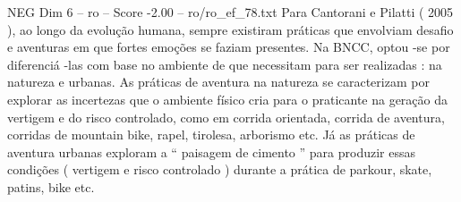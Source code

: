 \begin{textsample}{NEG Dim 6 – ro – Score -2.00 – ro/ro\_ef\_78.txt}
Para Cantorani e Pilatti ( 2005 ), ao longo da evolução humana, sempre existiram práticas que envolviam desafio e aventuras em que fortes emoções se faziam presentes.
Na BNCC, optou -se por diferenciá -las com base no ambiente de que necessitam para ser realizadas : na natureza e urbanas.
As práticas de aventura na natureza se caracterizam por explorar as incertezas que o ambiente físico cria para o praticante na geração da vertigem e do risco controlado, como em corrida orientada, corrida de aventura, corridas de mountain bike, rapel, tirolesa, arborismo etc.
Já as práticas de aventura urbanas exploram a “ paisagem de cimento ” para produzir essas condições ( vertigem e risco controlado ) durante a prática de parkour, skate, patins, bike etc.

\end{textsample}
